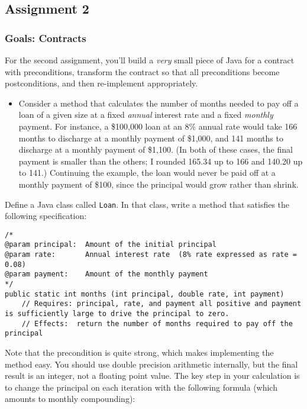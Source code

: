 \documentclass[11pt]{article}
\begin{document}
\subsection{Assignment 2}
\label{sec:orgfbf8dc5}
\subsubsection{Goals: Contracts}
\label{sec:org55e3997}

For the second assignment, you'll build a \emph{very} small piece of Java for a contract with preconditions, transform the contract so that all preconditions become postconditions, and then re-implement appropriately.

\begin{itemize}
\item Consider a method that calculates the number of months needed to pay off a loan of a given size at a fixed \emph{annual} interest rate and a fixed \emph{monthly} payment. For instance, a \$100,000 loan at an 8\% annual rate would take 166 months to discharge at a monthly payment of \$1,000, and 141 months to discharge at a monthly payment of \$1,100. (In both of these cases, the final payment is smaller than the others; I rounded 165.34 up to 166 and 140.20 up to 141.) Continuing the example, the loan would never be paid off at a monthly payment of \$100, since the principal would grow rather than shrink.
\end{itemize}

Define a Java class called \texttt{Loan}. In that class, write a method that satisfies the following specification:

\begin{verbatim}
/*
@param principal:  Amount of the initial principal
@param rate:       Annual interest rate  (8% rate expressed as rate = 0.08)
@param payment:    Amount of the monthly payment
*/
public static int months (int principal, double rate, int payment)
    // Requires: principal, rate, and payment all positive and payment is sufficiently large to drive the principal to zero.
    // Effects:  return the number of months required to pay off the principal
\end{verbatim}


Note that the precondition is quite strong, which makes implementing the method easy. You should use double precision arithmetic internally, but the final result is an integer, not a floating point value. The key step in your calculation is to change the principal on each iteration with the following formula (which amounts to monthly compounding):
\end{document}
